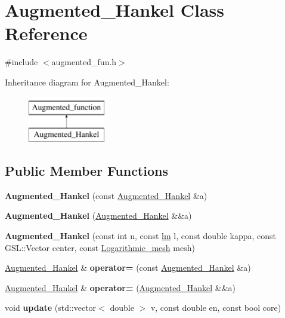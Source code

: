 \hypertarget{classAugmented__Hankel}{}\section{Augmented\+\_\+\+Hankel Class Reference}
\label{classAugmented__Hankel}


{\ttfamily \#include $<$augmented\+\_\+fun.\+h$>$}

Inheritance diagram for Augmented\+\_\+\+Hankel\+:\begin{figure}[H]
\begin{center}
\leavevmode
\includegraphics[height=2.000000cm]{classAugmented__Hankel}
\end{center}
\end{figure}
\subsection*{Public Member Functions}
\begin{DoxyCompactItemize}
\item 
\mbox{\label{classAugmented__Hankel_ab4abeef208eef604e8f9ec9f962a33c9}} 
{\bfseries Augmented\+\_\+\+Hankel} (const \hyperlink{classAugmented__Hankel}{Augmented\+\_\+\+Hankel} \&a)
\item 
\mbox{\label{classAugmented__Hankel_a1cd888e6d4bf801283e557c44cbe6e2a}} 
{\bfseries Augmented\+\_\+\+Hankel} (\hyperlink{classAugmented__Hankel}{Augmented\+\_\+\+Hankel} \&\&a)
\item 
\mbox{\label{classAugmented__Hankel_af5204b9ee0f1aa65c924f20d671a420c}} 
{\bfseries Augmented\+\_\+\+Hankel} (const int n, const \hyperlink{structlm}{lm} l, const double kappa, const G\+S\+L\+::\+Vector center, const \hyperlink{classLogarithmic__mesh}{Logarithmic\+\_\+mesh} mesh)
\item 
\mbox{\label{classAugmented__Hankel_aeefa7e11896971fb1ea326a4ec5d2d06}} 
\hyperlink{classAugmented__Hankel}{Augmented\+\_\+\+Hankel} \& {\bfseries operator=} (const \hyperlink{classAugmented__Hankel}{Augmented\+\_\+\+Hankel} \&a)
\item 
\mbox{\label{classAugmented__Hankel_a9c37b93980c8422d9f15a5d3f8583c5e}} 
\hyperlink{classAugmented__Hankel}{Augmented\+\_\+\+Hankel} \& {\bfseries operator=} (\hyperlink{classAugmented__Hankel}{Augmented\+\_\+\+Hankel} \&\&a)
\item 
\mbox{\label{classAugmented__Hankel_ad061623ff90bc66de8c5cf9573f5b72b}} 
void {\bfseries update} (std\+::vector$<$ double $>$ v, const double en, const bool core)
\end{DoxyCompactItemize}
